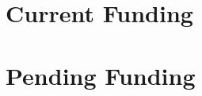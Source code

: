 \documentclass[12pt]{article}
\renewenvironment{itemize}{
  \begin{list}{}{
    \setlength{\itemsep}{0.25em}
    \setlength{\parskip}{0pt}
    \setlength{\parsep}{0.25em}
  }
}{
  \end{list}
}
\begin{document}
\section*{Current Funding}

\section*{Pending Funding}

%


%
%
%
%

%
%
%
\end{document}
